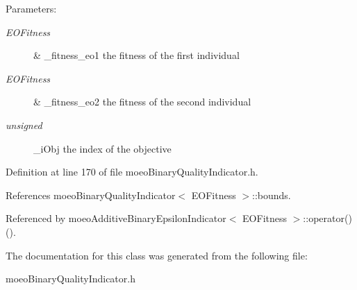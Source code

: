 \begin{Desc}
\item[Parameters:]
\begin{description}
\item[{\em EOFitness}]\& \_\-fitness\_\-eo1 the fitness of the first individual \item[{\em EOFitness}]\& \_\-fitness\_\-eo2 the fitness of the second individual \item[{\em unsigned}]\_\-i\-Obj the index of the objective \end{description}
\end{Desc}


Definition at line 170 of file moeo\-Binary\-Quality\-Indicator.h.

References moeo\-Binary\-Quality\-Indicator$<$ EOFitness $>$::bounds.

Referenced by moeo\-Additive\-Binary\-Epsilon\-Indicator$<$ EOFitness $>$::operator()().

The documentation for this class was generated from the following file:\begin{CompactItemize}
\item 
moeo\-Binary\-Quality\-Indicator.h\end{CompactItemize}
